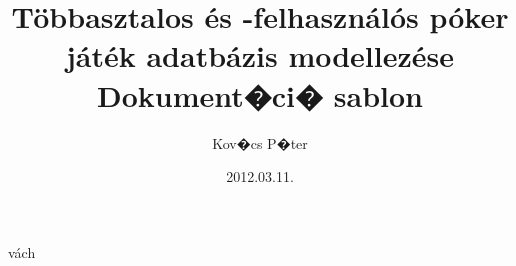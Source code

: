 \documentclass[oneside,11pt,a4paper]{article}
\title{Többasztalos és -felhasználós póker játék adatbázis modellezése\\ \vspace{3mm} \large Dokument�ci� sablon}
\author{Kov�cs P�ter}
\date{2012.03.11.}
\begin{document}
\maketitle
vách
\end{document}
